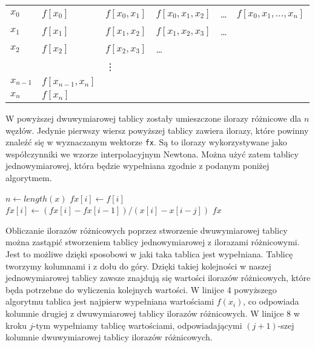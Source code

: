 \documentclass[a4paper]{article}
\theoremstyle{plain}
\begin{document}
\begin{center}
 \begin{tabular}{ l  l  l  l  l  l }
 $x_{0}$ & $f[x_{0}]$ & $f[x_{0}, x_{1}]$ & $f[x_{0}, x_{1}, x_{2}]$ & \ldots & $f[x_{0}, x_{1}, ...,x_{n}]$ \\
 $x_{1}$ & $f[x_{1}]$ & $f[x_{1}, x_{2}]$ & $f[x_{1}, x_{2}, x_{3}]$ & \ldots & \\
 $x_{2}$ & $f[x_{2}]$ & $f[x_{2}, x_{3}]$ & \ldots & & \\
  & & \vdots & & & \\
 $x_{n - 1}$ & $f[x_{n - 1}, x_{n}]$ & & & \\
 $x_{n}$ & $f[x_{n}]$ & & & & \\
\end{tabular}
\end{center}

W powyższej dwuwymiarowej tablicy zostały umieszczone ilorazy różnicowe dla $n$ węzłów. Jedynie pierwszy wiersz powyższej tablicy zawiera ilorazy, które powinny znaleźć się w wyznaczanym wektorze \texttt{fx}. Są to ilorazy wykorzystywane jako współczynniki we wzorze interpolacyjnym Newtona. Można użyć zatem tablicy jednowymiarowej, która będzie wypełniana zgodnie z podanym poniżej algorytmem.

\begin{center}
	\begin{algorithmic}[1]
		\State $n \gets length(x)$
    		\State $fx[i] \gets f[i]$
    	\EndFor
				\State $fx[i] \gets (fx[i] - fx[i - 1]) / (x[i] - x[i - j])$    
    		\EndFor
    	\EndFor
    	\State \Return $fx$
	\EndFunction
	\end{algorithmic}
\end{center}

Obliczanie ilorazów różnicowych poprzez stworzenie dwuwymiarowej tablicy można zastąpić stworzeniem tablicy jednowymiarowej z ilorazami różnicowymi. Jest to możliwe dzięki sposobowi w jaki taka tablica jest wypełniana. Tablicę tworzymy kolumnami i z dołu do góry. Dzięki takiej kolejności w naszej jednowymiarowej tablicy zawsze znajdują się wartości ilorazów różnicowych, które będa potrzebne do wyliczenia kolejnych wartości. W linijce 4 powyższego algorytmu tablica jest najpierw wypełniana wartościami $f(x_{i})$, co odpowiada kolumnie drugiej z dwuwymiarowej tablicy ilorazów różnicowych. W linijce 8 w kroku $j$-tym wypełniamy tablicę wartościami, odpowiadającymi $(j + 1)$-szej kolumnie dwuwymiarowej tablicy ilorazów różnicowych.
\end{document}

